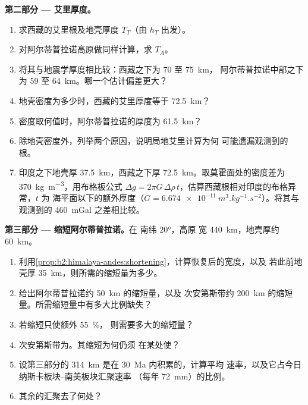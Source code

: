 \begin{problem}
\noindent\textbf{第二部分 --- 艾里厚度。}
\begin{enumerate}[resume]
\item 求西藏的艾里根及地壳厚度 $T_T$（由 $h_T$ 出发）。
\item 对阿尔蒂普拉诺高原做同样计算，求 $T_A$。
\item 将其与地震学厚度相比较：西藏之下为 70 至 \qty{75}{km}，
阿尔蒂普拉诺中部之下为 59 至 \qty{64}{km}。哪一个估计偏差更大？
\item 地壳密度为多少时，西藏的艾里厚度等于 \qty{72.5}{km}？
\item 密度取何值时，阿尔蒂普拉诺的厚度为 \qty{61.5}{km}？
\item 除地壳密度外，列举两个原因，说明局地艾里计算为何
可能遗漏观测到的根。
\item 印度之下地壳厚 \qty{37.5}{km}，西藏之下厚 \qty{72.5}{km}。取莫霍面处的密度差为
\qty{370}{kg.m^{-3}}，用布格板公式 $\Delta g
= 2\pi G\,\Delta\rho\,t$，估算西藏根相对印度的布格异常，$t$ 为
海平面以下的额外厚度（$G = \qty{6.674e-11}{m^3.kg^{-1}.s^{-2}}$）。将其与
观测到的 \qty{460}{mGal} 之差相比较。
\end{enumerate}

\noindent\textbf{第三部分 --- 缩短阿尔蒂普拉诺。}在 南纬 \ang{20}，高原
宽 \qty{440}{km}，地壳厚约 \qty{60}{km}。
\begin{enumerate}[resume]
\item 利用\cref{prop:b2:himalaya-andes:shortening}，计算恢复后的宽度，以及
若此前地壳厚 \qty{35}{km}，则所需的缩短量为多少。
\item {}给出阿尔蒂普拉诺约 \qty{50}{km} 的缩短量，以及
次安第斯带约 \qty{200}{km} 的缩短量。所需缩短量中有多大比例缺失？
\item 若缩短只使额外 \qty{55}{\percent}，
则需要多大的缩短量？
\item 次安第斯带为。其缩短为何仍须
在某处使？
\item 设第三部分的 \qty{314}{km} 是在 \qty{30}{Ma} 内积累的，计算平均
速率，以及它占今日纳斯卡板块–南美板块汇聚速率
（每年 \qty{72}{mm}）的比例。
\item 其余的汇聚去了何处？
\end{enumerate}


\end{problem}
